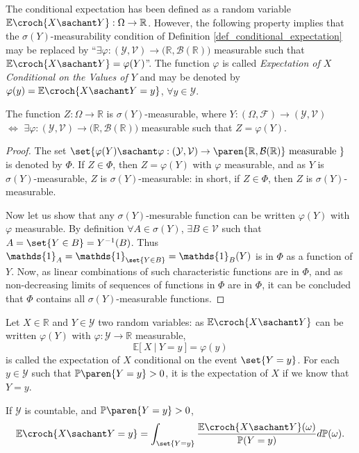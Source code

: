 The conditional expectation has been defined 
as a random variable $\mathbb{E} \croch{ X \sachant Y }: \Omega \rightarrow \mathbb{R}$. 
However, the following property implies that
the $\sigma(Y)$-measurability condition of Definition \ref{def_conditional_expectation} 
may be replaced by 
``$\exists \varphi: (\mathcal{Y}, \mathcal{V}) \rightarrow \Big( \mathbb{R}, \mathcal{B}(\mathbb{R})\Big)$  measurable 
such that $\mathbb{E} \croch{ X \sachant Y  } = \varphi (Y)$''.
The function $\varphi$ is called \textit{Expectation of $X$ Conditional on the Values
of $Y$} and may be denoted by $\varphi(y) = \mathbb{E} \croch{ X \sachant Y = y}$,
$\forall y \in \mathcal{Y}$. 
\begin{Property}
\label{sigmaYmeas_phi}
The function $Z:\Omega \rightarrow \mathbb{R}$ is $\sigma(Y)$-measurable, where $Y: (\Omega,\mathcal{F}) \rightarrow (\mathcal{Y},\mathcal{V})$ \\ 
$\Leftrightarrow$ $\exists \varphi: (\mathcal{Y}, \mathcal{V}) \rightarrow \Big( \mathbb{R}, \mathcal{B}(\mathbb{R}) \Big)$  measurable such that $Z = \varphi(Y)$.
\end{Property}
\begin{proof}
The set $\set{ \varphi(Y) \sachant \varphi: (\mathcal{Y}, \mathcal{V}) \rightarrow \paren{ \mathbb{R}, \mathcal{B}(\mathbb{R})} \mbox{ measurable }  }$ is denoted by $\Phi$.
If $Z \in \Phi$, then $Z = \varphi(Y)$ with $\varphi$ measurable,
and as $Y$ is $\sigma(Y)$-measurable, $Z$ is $\sigma(Y)$-measurable: 
in short, if $Z \in \Phi$, then $Z$ is $\sigma(Y)$-measurable. 

Now let us show that any $\sigma(Y)$-mesurable function 
can be written $\varphi(Y)$ with $\varphi$ measurable. 
By definition $\forall A \in \sigma(Y)$, $\exists B \in \mathcal{V}$ such that 
$A = \set{ Y \in B } = Y^{-1}(B)$. Thus $\mathds{1}_{A} = \mathds{1}_{ \set{Y \in B}} = \mathds{1}_B(Y)$ is in $\Phi$
as a function of $Y$.
Now, as linear combinations of such characteristic functions are in $\Phi$,
and as non-decreasing limits of sequences of functions in $\Phi$ are in $\Phi$,
it can be concluded that $\Phi$ contains all $\sigma(Y)$-measurable functions.
\end{proof}
\begin{Def}
Let $X \in \mathbb{R}$ and $Y \in \mathcal{Y}$ two random variables:
as $\mathbb{E} \croch{ X \sachant Y }$ can be written $\varphi(Y)$
with $\varphi:\mathcal{Y} \rightarrow \mathbb{R}$ measurable, 
\[ \mathbb{E} \Big[ \ X \ \Big\vert \  Y = y \ \Big] = \varphi(y) \]
is called the expectation of $X$ conditional on the event $\set{Y=y}$. 
For each $y \in \mathcal{Y}$ such that $\mathbb{P} \paren{ Y = y}>0$, 
it is the expectation of $X$ 
if we know that $Y=y$.

If $\mathcal{Y}$ is countable, and $\mathbb{P} \paren{ Y = y}>0$,
\[ \mathbb{E} \croch{ X \sachant Y = y } 
=  \int_{\set{Y=y}} \frac{\mathbb{E} \croch{ X \sachant Y }(\omega)}{\mathbb{P}(Y=y)} d \mathbb{P}(\omega) .\]
\end{Def}
